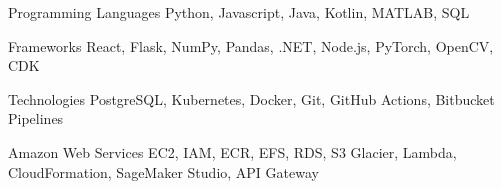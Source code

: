 
\begin{cvskills}
  \cvskill 
    {Programming Languages}
    {Python, Javascript, Java, Kotlin, MATLAB, SQL}

  \cvskill
    {Frameworks}
    {React, Flask, NumPy, Pandas, .NET, Node.js, PyTorch, OpenCV, CDK}

    \cvskill 
    {Technologies}
    {PostgreSQL, Kubernetes, Docker, Git, GitHub Actions, Bitbucket Pipelines}


    \cvskill 
    {Amazon Web Services}
    {EC2, IAM, ECR, EFS, RDS, S3 Glacier, Lambda, CloudFormation, SageMaker Studio, API Gateway}


\end{cvskills}
